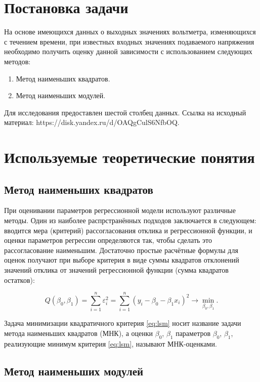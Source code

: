 \documentclass[12pt,a4paper]{article}
\begin{document}
\tableofcontents

\newpage

\section{Постановка задачи}

На основе имеющихся данных о выходных значениях вольтметра, изменяющихся с течением времени, при известных входных значениях подаваемого напряжения необходимо получить оценку данной зависимости с использованием следующих методов:
\begin{enumerate}
    \item Метод наименьших квадратов.
    \item Метод наименьших модулей.
\end{enumerate}
Для исследования предоставлен шестой столбец данных. Ссылка на исходный материал: https://disk.yandex.ru/d/OAQgCulS6NfbOQ.
\section{Используемые теоретические понятия}
\subsection{Метод наименьших квадратов}
При оценивании параметров регрессионной модели используют различные
методы. Один из наиболее распрстранённых подходов заключается в
следующем: вводится мера (критерий) рассогласования отклика и
регрессионной функции, и оценки параметров регрессии определяются так,
чтобы сделать это рассогласование наименьшим. Достаточно простые
расчётные формулы для оценок получают при выборе критерия в виде суммы
квадратов отклонений значений отклика от значений регрессионной функции
(сумма квадратов остатков):

\begin{equation} \label{eq:lsm}
    Q(\beta_0, \beta_1) = \sum \limits_{i=1}^n \varepsilon_i^2 =
    \sum \limits_{i=1}^n (y_i - \beta_0 - \beta_1 x_i)^2 \rightarrow
    \min_{\beta_0, \beta_1}.
\end{equation}

Задача минимизации квадратичного критерия \eqref{eq:lsm} носит название
задачи метода наименьших квадратов (МНК), а оценки \( \beta_0 \),
\( \beta_1 \) параметров \( \beta_0 \), \( \beta_1 \), реализующие минимум
критерия \eqref{eq:lsm}, называют МНК-оценками.

\subsection{Метод наименьших модулей}
\end{document}
